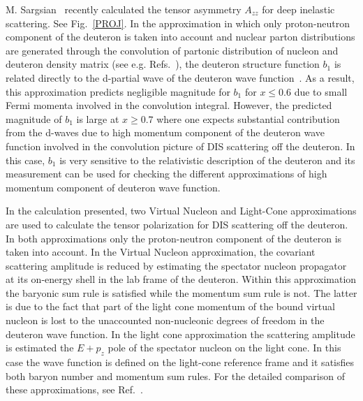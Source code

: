 M. Sargsian~\cite{MISAK} recently calculated the tensor asymmetry $A_{zz}$ for deep inelastic scattering.   
%
See Fig.~\ref{PROJ}.  In the approximation in which  only proton-neutron component of the deuteron is taken into account and  nuclear parton distributions
are generated through the convolution of partonic distribution of nucleon and deuteron density matrix (see e.g. Refs.~\cite{Frankfurt:1981mk,Sargsian:2001gu}), %
the deuteron structure function $b_1$ is related directly to the d-partial wave of the deuteron wave function~\cite{MISAK,Frankfurt:1981mk}.   %
As a result,  this approximation predicts negligible  magnitude for $b_1$  for $x\le 0.6 $ due to small Fermi momenta involved  in the convolution integral. 
However, the predicted magnitude of $b_1$ is large at $x \ge 0.7$ where one expects substantial contribution from the d-waves due to 
high momentum component of the deuteron wave function involved in the convolution picture of DIS scattering off the deuteron.
In this case, $b_1$ is very sensitive to the relativistic description of the deuteron and its measurement can be used for checking 
the different approximations of high momentum  component of deuteron wave function.  

In the calculation presented, two Virtual Nucleon  and Light-Cone approximations are used to calculate the  tensor polarization for 
DIS scattering off the deuteron.  In both approximations only the proton-neutron component of the deuteron is taken into account.
In the Virtual Nucleon approximation, the covariant scattering amplitude is reduced  by estimating the spectator nucleon 
propagator at its on-energy shell in the lab frame of the deuteron.  Within this approximation the baryonic sum rule is satisfied while the 
momentum sum rule is not. The latter is due to the fact that part of the light cone momentum of the bound  virtual nucleon is lost to the 
unaccounted non-nucleonic degrees of freedom in the deuteron wave function.
In the light cone approximation the scattering amplitude is estimated the $E+p_z$ pole of the spectator nucleon on the light cone.
In this case the wave function is defined on the light-cone reference frame and it satisfies both baryon number and momentum sum rules.
For the detailed comparison  of these approximations, see Ref.~\cite{Sargsian:2001gu}.   %

